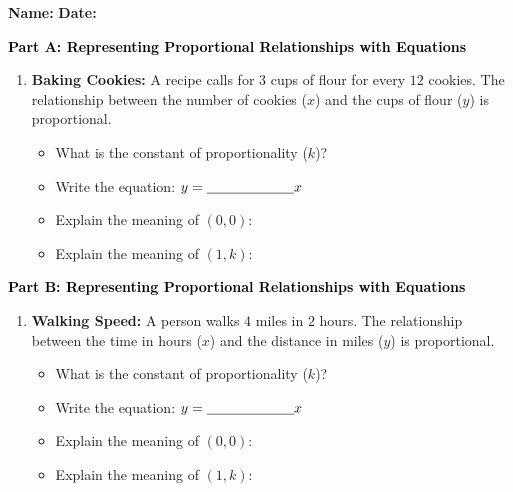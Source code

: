 \documentclass[12pt, letterpaper, fleqn]{article}
\newcommand{\blank}{\underline{\hspace{2.2cm}}}
\newcommand{\blanklong}{\underline{\hspace{6.5cm}}}
\newcommand{\blankshorter}{\underline{\hspace{1.5cm}}}
\begin{document}
\textbf{Name:} \underline{\hspace{5cm}}
\hfill
\textbf{Date:} \underline{\hspace{3cm}}\\

\begin{tcolorbox}[colback=customteal!20]
\large\textcolor{black}{\textbf{Part A: Representing Proportional Relationships with Equations}}
\end{tcolorbox}

\vspace{3mm}

\begin{enumerate}[itemsep=2.2cm, leftmargin=0.6cm]
\item \textbf{Baking Cookies:} A recipe calls for $3$ cups of flour for every $12$ cookies. The relationship between the number of cookies ($x$) and the cups of flour ($y$) is proportional.
\begin{itemize}
\item What is the constant of proportionality ($k$)? \blankshorter
\item Write the equation: $y = \blank x$
\item Explain the meaning of $(0,0)$: \blanklong
\item Explain the meaning of $(1, k)$: \blanklong
\end{itemize}
\end{enumerate}

\newpage

\begin{tcolorbox}[colback=customteal!20]
\large\textcolor{black}{\textbf{Part B: Representing Proportional Relationships with Equations}}
\end{tcolorbox}

\vspace{3mm}

\begin{enumerate}[itemsep=2.2cm, leftmargin=0.6cm, resume]
\item \textbf{Walking Speed:} A person walks $4$ miles in $2$ hours. The relationship between the time in hours ($x$) and the distance in miles ($y$) is proportional.
\begin{itemize}
\item What is the constant of proportionality ($k$)? \blankshorter
\item Write the equation: $y = \blank x$
\item Explain the meaning of $(0,0)$: \blanklong
\item Explain the meaning of $(1, k)$: \blanklong
\end{itemize}
\end{enumerate}
\end{document}

